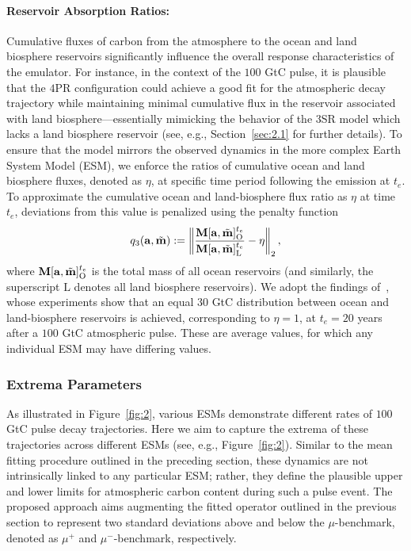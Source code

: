\documentclass[11pt, a4paper, pdftex, twoside, dvipsnames]{article}
\renewcommand{\ref}{\cref}
\newcommand{\bb}[1]{\boldsymbol{\bold{#1}}}
\newcommand{\bbt}[1]{\tilde{\boldsymbol{\mathrm{#1}}}}
\newcommand{\ameq}[0]{\bb{a},\bbt{m}}
\begin{document}
\paragraph{Reservoir Absorption Ratios:}
Cumulative fluxes of carbon from the atmosphere to the ocean and land biosphere reservoirs significantly influence the overall response characteristics of the emulator.
%
For instance, in the context of the $100$ GtC pulse, it is plausible that the $4$PR configuration could achieve a good fit for the atmospheric decay trajectory while maintaining minimal cumulative flux in the reservoir associated with land biosphere---essentially mimicking the behavior of the $3$SR model which lacks a land biosphere reservoir (see, e.g., Section~\ref{sec:2.1} for further details).
%
To ensure that the model mirrors the observed dynamics in the more complex Earth System Model (ESM), we enforce the ratios of cumulative ocean and land biosphere fluxes, denoted as $\eta$, at specific time period following the emission at $t_e$.
%
To approximate the cumulative ocean and land-biosphere flux ratio as $\eta$ at time $t_e$, deviations from this value is penalized using the penalty function
%
\begin{align}\label{eq:q3}
	q_3(\ameq) := \left \| \frac{  
	\bb{M}[ \ameq ]_{\text{O}}^{t_e}
	}{
	\bb{M}[ \ameq]_{\text{L}}^{t_e}} - \eta \right \|_2,
\end{align}
%
where $\bb{M}[\bb{a},\bbt{m}]^{t_e}_{\text{O}}$ is the total mass of all ocean reservoirs (and similarly, the superscript $\text{L}$ denotes all land biosphere reservoirs).
%
We adopt the findings of~\cite{joos2013carbon}, whose experiments show that an equal $30$ GtC distribution between ocean and land-biosphere reservoirs is achieved, corresponding to $\eta = 1$, at $t_e = 20$ years after a $100$ GtC atmospheric pulse.
%
These are average values, for which any individual ESM may have differing values.


\subsubsection{Extrema Parameters} \label{sec:2.2.2}
As illustrated in Figure~\ref{fig:2}, various ESMs demonstrate different rates of $100$ GtC pulse decay trajectories. 
%
Here we aim to capture the extrema of these trajectories across different ESMs (see, e.g., Figure~\ref{fig:2}).
%
Similar to the mean fitting procedure outlined in the preceding section, these dynamics are not intrinsically linked to any particular ESM; rather, they define the plausible upper and lower limits for atmospheric carbon content during such a pulse event.
%
The proposed approach aims augmenting the fitted operator outlined in the previous section to represent two standard deviations above and below the $\mu$-benchmark, denoted as $\mu^+$ and $\mu^-$-benchmark, respectively.
\end{document}

